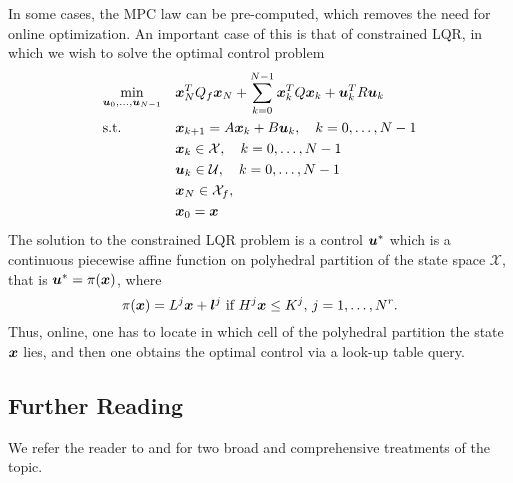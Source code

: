 In some cases, the MPC law can be pre-computed, which removes the need for online optimization. An important case of this is that of constrained LQR, in which we wish to solve the optimal control problem
\begin{equation}
\begin{aligned}
\label{eq:ocp}
& \underset{\bm{u}_{0}, \ldots, \bm{u}_{N-1}}{\min} & & \bm{x}_N^T Q_f \bm{x}_N + \sum_{k=0}^{N-1} \bm{x}_k^T Q \bm{x}_k + \bm{u}_k^T R \bm{u}_k\\
& \textrm{s.t.} & & \bm{x}_{k+1} = A \bm{x}_{k} + B \bm{u}_{k}, \quad k = 0, \ldots, N-1 \\
& & & \bm{x}_{k} \in \mathcal{X},  \quad k = 0, \ldots, N-1 \\
& & & \bm{u}_{k} \in \mathcal{U},  \quad k = 0, \ldots, N-1 \\
& & & \bm{x}_{N} \in \mathcal{X}_f, \\
& & & \bm{x}_{0} = \bm{x}
\end{aligned}
\end{equation}
The solution to the constrained LQR problem is a control $\bm{u}^*$ which is a continuous piecewise affine function on polyhedral partition of the state space $\mathcal{X}$, that is $\bm{u}^* = \pi(\bm{x})$, where
\begin{equation}
    \pi(\bm{x}) = L^j \bm{x} + \bm{l}^j\,\,\text{if}\,\, H^j\bm{x} \leq K^j, \, j = 1, \ldots, N^r.
\end{equation}
Thus, online, one has to locate in which cell of the polyhedral partition the state $\bm{x}$ lies, and then one obtains the optimal control via a look-up table query.

\subsection{Further Reading}

We refer the reader to \cite{borrelli2017predictive} and \cite{rawlings2017model} for two broad and comprehensive treatments of the topic. 